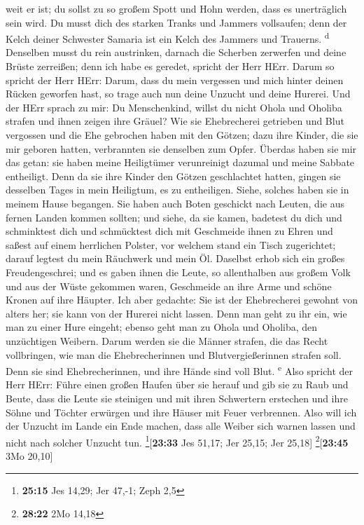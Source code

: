 weit er ist; du sollst zu so großem Spott und Hohn werden, dass es
unerträglich sein wird.  Du musst dich des starken Tranks
und Jammers vollsaufen; denn der Kelch deiner Schwester Samaria ist ein
Kelch des Jammers und Trauerns. \textsuperscript{d} 
Denselben musst du rein austrinken, darnach die Scherben zerwerfen und
deine Brüste zerreißen; denn ich habe es geredet, spricht der Herr HErr.
 Darum so spricht der Herr HErr: Darum, dass du mein
vergessen und mich hinter deinen Rücken geworfen hast, so trage auch nun
deine Unzucht und deine Hurerei.  Und der HErr sprach zu
mir: Du Menschenkind, willst du nicht Ohola und Oholiba strafen und
ihnen zeigen ihre Gräuel?  Wie sie Ehebrecherei getrieben
und Blut vergossen und die Ehe gebrochen haben mit den Götzen; dazu ihre
Kinder, die sie mir geboren hatten, verbrannten sie denselben zum Opfer.
 Überdas haben sie mir das getan: sie haben meine
Heiligtümer verunreinigt dazumal und meine Sabbate entheiligt.
 Denn da sie ihre Kinder den Götzen geschlachtet hatten,
gingen sie desselben Tages in mein Heiligtum, es zu entheiligen. Siehe,
solches haben sie in meinem Hause begangen.  Sie haben
auch Boten geschickt nach Leuten, die aus fernen Landen kommen sollten;
und siehe, da sie kamen, badetest du dich und schminktest dich und
schmücktest dich mit Geschmeide ihnen zu Ehren  und
saßest auf einem herrlichen Polster, vor welchem stand ein Tisch
zugerichtet; darauf legtest du mein Räuchwerk und mein Öl.
 Daselbst erhob sich ein großes Freudengeschrei; und es
gaben ihnen die Leute, so allenthalben aus großem Volk und aus der Wüste
gekommen waren, Geschmeide an ihre Arme und schöne Kronen auf ihre
Häupter.  Ich aber gedachte: Sie ist der Ehebrecherei
gewohnt von alters her; sie kann von der Hurerei nicht lassen.
 Denn man geht zu ihr ein, wie man zu einer Hure eingeht;
ebenso geht man zu Ohola und Oholiba, den unzüchtigen Weibern.
 Darum werden sie die Männer strafen, die das Recht
vollbringen, wie man die Ehebrecherinnen und Blutvergießerinnen strafen
soll. Denn sie sind Ehebrecherinnen, und ihre Hände sind voll Blut.
\textsuperscript{e}  Also spricht der Herr HErr: Führe
einen großen Haufen über sie herauf und gib sie zu Raub und Beute,
 dass die Leute sie steinigen und mit ihren Schwertern
erstechen und ihre Söhne und Töchter erwürgen und ihre Häuser mit Feuer
verbrennen.  Also will ich der Unzucht im Lande ein Ende
machen, dass alle Weiber sich warnen lassen und nicht nach solcher
Unzucht tun. \footnote{\textbf{25:15} Jes 14,29; Jer 47,-1; Zeph 2,5}{[}\textbf{23:33}
Jes 51,17; Jer 25,15; Jer 25,18{]} \footnote{\textbf{28:22} 2Mo 14,18}{[}\textbf{23:45}
3Mo 20,10{]}

